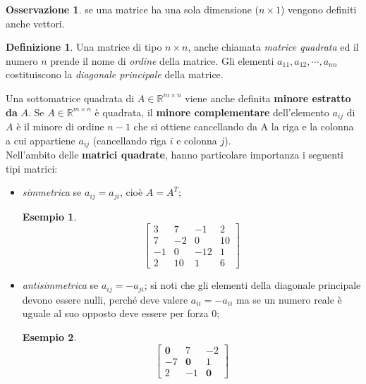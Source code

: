\documentclass{book}
\theoremstyle{definition}
\newtheorem{defi}{Definizione}[section]
\newtheorem{es}{Esempio}[section]
\newtheorem{oss}{Osservazione}[section]
\theoremstyle{plain}
\begin{document}
\begin{oss}
  \label{oss:matrice1}
  se una matrice ha una sola dimensione ($n\times 1$) vengono definiti
  anche vettori.
\end{oss}
\begin{defi}
  \label{defi:matrice4}
  Una matrice di tipo $n\times n$, anche chiamata \textit{matrice
    quadrata} ed il numero $n$ prende il nome di \textit{ordine} della
  matrice. Gli elementi $a_{11},a_{12},\cdots,a_{nn}$ costituiscono la
  \textit{diagonale principale} della matrice.

  Una sottomatrice quadrata di $A\in\mathds{R}^{m\times n}$ viene anche
  definita \textbf{minore estratto da} $A$. Se $A\in\mathds{R}^{m\times n}$
  è quadrata, il \textbf{minore complementare} dell'elemento $a_{ij}$ di
  $A$ è il minore di ordine $n-1$ che si ottiene cancellando da A la
  riga e la colonna a cui appartiene $a_{ij}$ (cancellando riga $i$ e
  colonna $j$).\\
  Nell'ambito delle \textbf{matrici quadrate}, hanno particolare
  importanza i seguenti tipi matrici:
  \begin{itemize}
  \item \textit{simmetrica} se $a_{ij}=a_{ji}$, cioè $A=A^T$;
    \begin{es}
      \label{es:matrice4-1}
      \begin{equation*}
        \begin{bmatrix}
          3 & 7 & -1 & 2\\
          7 & -2 & 0 & 10\\
          -1 & 0 & -12 & 1\\
          2 & 10 & 1 & 6 
        \end{bmatrix}
      \end{equation*}
    \end{es}
  \item \textit{antisimmetrica} se $a_{ij}=-a_{ji}$; si noti che gli
    elementi della diagonale principale devono essere nulli, perché deve
    valere $a_{ii}=-a_{ii}$ ma se un numero reale è uguale al suo opposto
    deve essere per forza 0;
    \begin{es}
      \label{es:matrice4-2}
      \begin{equation*}
        \begin{bmatrix}
          \mathbf{0} & 7 & -2\\
          -7 & \mathbf{0} & 1\\
          2 & -1 & \mathbf{0}
        \end{bmatrix}

\end{equation*}
\end{es}
\end{itemize}
\end{defi}
\end{document}
